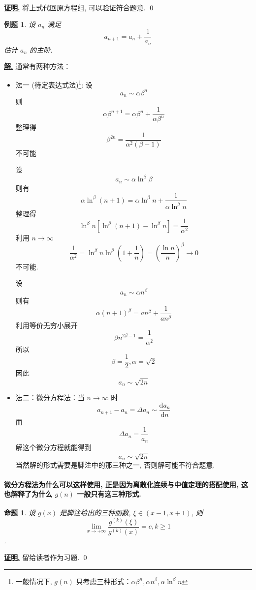 \documentclass[10pt,a4paper]{book}
\theoremstyle{thmstyle} %
\theoremstyle{defstyle} %
\theoremstyle{prostyle} %
\newtheorem{proposition}{命题}[chapter]
\newtheorem{example}{例题}[chapter]
\renewenvironment{proof}[1][证明]{\par{\kaishu \uline{\textbf{#1.}}} \;\fangsong}{\qed\par}
\newenvironment{solution}{\par\underline{\textbf{解.}} \;\kaishu}{\par}
\begin{document}
	\begin{proof}
		将上式代回原方程组, 可以验证符合题意. 
	\end{proof}
	\begin{example}
		设 ${a_n}$ 满足$$a_{n+1}=a_n+\frac{1}{a_n}$$估计 $a_n$ 的主阶.
	\end{example}
	\begin{solution}
		通常有两种方法：
		\begin{itemize}
			\item 法一 (待定表达式法)\footnote{一般情况下, $g(n)$ 只考虑三种形式：$\alpha\beta^n,\alpha n^\beta,\alpha \ln^\beta n$}: 设$$a_n\sim \alpha \beta ^n$$则$$\alpha \beta ^{n+1}=\alpha \beta ^n+\frac{1}{\alpha \beta ^n}$$整理得$$\beta ^{2n}=\frac{1}{\alpha ^2\left( \beta -1 \right)}$$不可能
			
			设$$a_n\sim \alpha \ln ^{\beta}\beta$$则有$$\alpha \ln ^{\beta}\left( n+1 \right) =\alpha \ln ^{\beta}n+\frac{1}{\alpha \ln ^{\beta}n}$$整理得$$\ln ^{\beta}n\left[ \ln ^{\beta}\left( n+1 \right) -\ln ^{\beta}n \right] =\frac{1}{\alpha ^2}$$利用 $n\rightarrow\infty$$$\frac{1}{\alpha ^2}=\ln ^{\beta}n\ln ^{\beta}\left( 1+\frac{1}{n} \right) =\left( \frac{\ln n}{n} \right) ^{\beta}\rightarrow 0$$不可能. 
		
			设$$a_n\sim \alpha n^{\beta}$$则有$$\alpha \left( n+1 \right)^{\beta}=an^{\beta}+\frac{1}{an^{\beta}}$$利用等价无穷小展开$$\beta n^{2\beta -1}=\frac{1}{\alpha ^2}$$所以$$\beta =\frac{1}{2},\alpha =\sqrt{2}$$因此$$a_n\sim \sqrt{2n}$$
			
			
			\item 法二：微分方程法：当 $n\rightarrow \infty$ 时
			$$
			a_{n+1}-a_n=\Delta a_n\sim \frac{\mathrm{d} a_n}{\mathrm{d} n}
			$$
			而
			$$
			\Delta a_n=\frac{1}{a_n}
			$$
			解这个微分方程就能得到$$a_n\sim \sqrt{2n}$$当然解的形式需要是脚注中的那三种之一, 否则解可能不符合题意.
			
		\end{itemize}
	\end{solution} 
	\paragraph{微分方程法为什么可以这样使用, 正是因为离散化连续与中值定理的搭配使用, 这也解释了为什么 $g(n)$ 一般只有这三种形式.}
	\begin{proposition}
		设 $g\left( x \right)$ 是脚注给出的三种函数, $\xi \in \left( x-1, x+1 \right)$, 则$$\lim\limits _{x\rightarrow +\infty}\frac{g^{\left( k \right)}\left( \xi \right)}{g^{\left( k \right)}\left( x \right)}=c, k\geqslant 1$$.
	\end{proposition}
	\begin{proof}
		留给读者作为习题.
	\end{proof}
	
\end{document}
